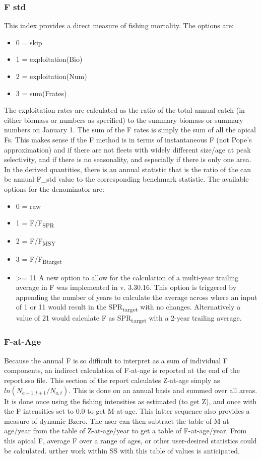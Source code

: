 \subsubsection{F std}
This index provides a direct measure of fishing mortality.  The options are:
\begin{itemize}
	\item 0 = skip
	\item 1 = exploitation(Bio)
	\item 2 = exploitation(Num)
	\item 3 = sum(Frates)
\end{itemize}
The exploitation rates are calculated as the ratio of the total annual catch (in either biomass or numbers as specified) to the summary biomass or summary numbers on January 1.  The sum of the F rates is simply the sum of all the apical Fs.  This makes sense if the F method is in terms of instantaneous F (not Pope's approximation) and if there are not fleets with widely different size/age at peak selectivity, and if there is no seasonality, and especially if there is only one area.  In the derived quantities, there is an annual statistic that is the ratio of the can be annual F\_std value to the corresponding benchmark statistic.  The available options for the denominator are:
\begin{itemize}
	\item 0 = raw
	\item 1 = F/F\textsubscript {SPR}
	\item 2 = F/F\textsubscript {MSY}
	\item 3 = F/F\textsubscript {Btarget}
	\item >= 11  A new option to allow for the calculation of a multi-year trailing average in F was implemented in v. 3.30.16. This option is triggered by appending the number of years to calculate the average across where an input of 1 or 11 would result in the SPR\textsubscript{target} with no changes.  Alternatively a value of 21 would calculate F as SPR\textsubscript{target} with a 2-year trailing average.
\end{itemize}

\subsubsection{F-at-Age}
Because the annual F is so difficult to interpret as a sum of individual F components, an indirect calculation of F-at-age is reported at the end of the report.sso file. This section of the report calculates Z-at-age simply as $ln(N_{a+1,t+1}/N_{a,t})$. This is done on an annual basis and summed over all areas. It is done once using the fishing intensities as estimated (to get Z), and once with the F intensities set to 0.0 to get M-at-age. This latter sequence also provides a measure of dynamic Bzero.  The user can then subtract the table of M-at-age/year from the table of Z-at-age/year to get a table of F-at-age/year. From this apical F, average F over a range of ages, or other user-desired statistics could be calculated.  urther work within SS with this table of values is anticipated.

